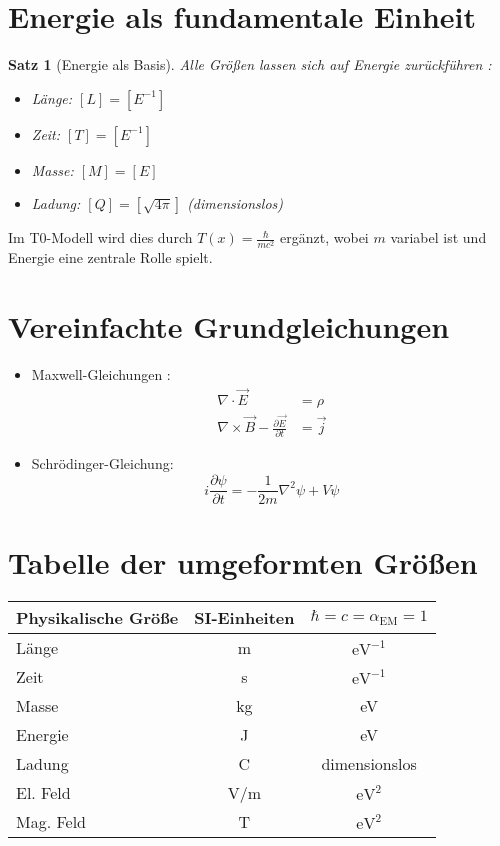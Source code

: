 \documentclass{article}
\newtheorem{theorem}{Satz}[section]
\newcommand{\Tfield}{T(x)}
\newcommand{\alphaEM}{\alpha_{\text{EM}}}
\begin{document}
	\section{Energie als fundamentale Einheit}
	\begin{theorem}[Energie als Basis]
		Alle Größen lassen sich auf Energie zurückführen \cite{Duff2002}:
		\begin{itemize}
			\item Länge: \([L] = [E^{-1}]\)
			\item Zeit: \([T] = [E^{-1}]\)
			\item Masse: \([M] = [E]\)
			\item Ladung: \([Q] = [\sqrt{4\pi}]\) (dimensionslos)
		\end{itemize}
	\end{theorem}
	
	Im T0-Modell wird dies durch \(\Tfield = \frac{\hbar}{mc^2}\) ergänzt, wobei \(m\) variabel ist und Energie eine zentrale Rolle spielt.
	
	\section{Vereinfachte Grundgleichungen}
	\begin{itemize}
		\item Maxwell-Gleichungen \cite{Feynman1985}:
		\begin{align}
			\nabla \cdot \vec{E} &= \rho \\
			\nabla \times \vec{B} - \frac{\partial \vec{E}}{\partial t} &= \vec{j}
		\end{align}
		\item Schrödinger-Gleichung:
		\begin{equation}
			i \frac{\partial \psi}{\partial t} = -\frac{1}{2m} \nabla^2 \psi + V \psi
		\end{equation}
	\end{itemize}
	
	\section{Tabelle der umgeformten Größen}
	\begin{center}
		\begin{tabular}{|l|c|c|}
			\hline
			\textbf{Physikalische Größe} & \textbf{SI-Einheiten} & \textbf{\(\hbar = c = \alphaEM = 1\)} \\
			\hline
			Länge & m & \(\text{eV}^{-1}\) \\
			Zeit & s & \(\text{eV}^{-1}\) \\
			Masse & kg & eV \\
			Energie & J & eV \\
			Ladung & C & dimensionslos \\
			El. Feld & V/m & \(\text{eV}^2\) \\
			Mag. Feld & T & \(\text{eV}^2\) \\
			\hline
		\end{tabular}
	\end{center}
	
\end{document}
